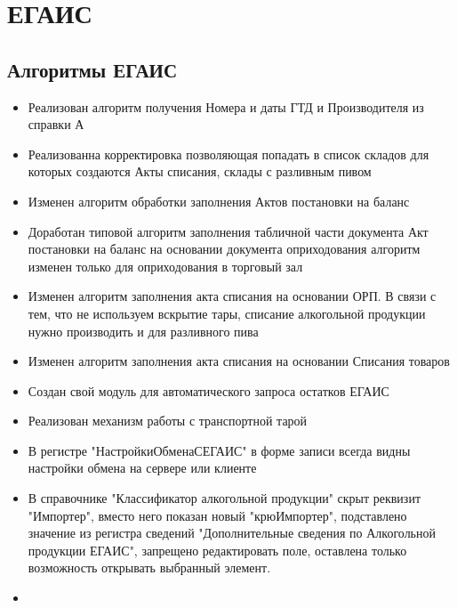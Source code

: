 \section{ЕГАИС}
\subsection{Алгоритмы ЕГАИС}


\begin{itemize}
	\item Реализован алгоритм получения Номера и даты ГТД и Производителя из справки А
	\item Реализованна корректировка позволяющая попадать в список складов для которых создаются Акты списания, склады с разливным пивом
	\item Изменен алгоритм обработки заполнения Актов постановки на баланс
	\item Доработан типовой алгоритм заполнения табличной части документа Акт постановки на баланс на 	основании документа оприходования алгоритм изменен только для оприходования в торговый зал
	\item Изменен алгоритм заполнения акта списания на основании ОРП. В связи с тем, что не используем вскрытие тары, списание алкогольной продукции  нужно производить и для разливного пива
	
	\item Изменен алгоритм заполнения акта списания на основании Списания товаров
	\item Создан свой модуль для автоматического запроса остатков ЕГАИС
	\item Реализован механизм работы с транспортной тарой
	\item В регистре "НастройкиОбменаСЕГАИС" в форме записи всегда видны настройки обмена на сервере или клиенте
	\item В справочнике "Классификатор алкогольной продукции" скрыт реквизит "Импортер", вместо него показан новый "крюИмпортер", подставлено значение из регистра сведений "Дополнительные сведения по Алкогольной продукции ЕГАИС", запрещено редактировать поле, оставлена только возможность открывать выбранный элемент.
	
	\item
	
\end{itemize}


